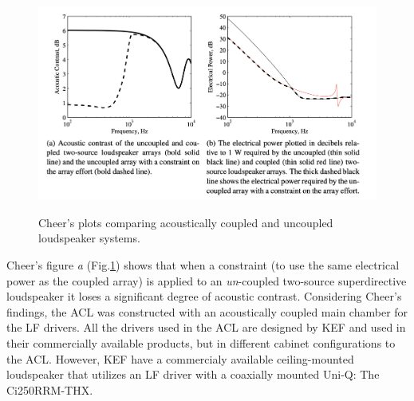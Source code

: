 \documentclass{report}
\begin{document}
        \begin{figure}[H]
            \centering
            \includegraphics[scale=0.5]{figs/cheerGraph.png}%
            \caption{Cheer's plots comparing acoustically coupled and uncoupled loudspeaker systems.}\cite{cheer2015robustness}
            \label{cheerGraph}
        \end{figure}

        Cheer's figure \textit{a} (Fig.\ref{cheerGraph}) shows that when a constraint (to use the same electrical power as the coupled array) is applied to an \textit{un}-coupled two-source superdirective loudspeaker it loses a significant degree of acoustic contrast.
        Considering Cheer's findings, the ACL was constructed with an acoustically coupled main chamber for the LF drivers.
        All the drivers used in the ACL are designed by KEF and used in their commercially available products, but in different cabinet configurations to the ACL.
        However, KEF have a commercialy available ceiling-mounted loudspeaker that utilizes an LF driver with a coaxially mounted Uni-Q: The Ci250RRM-THX.
        
\end{document}
